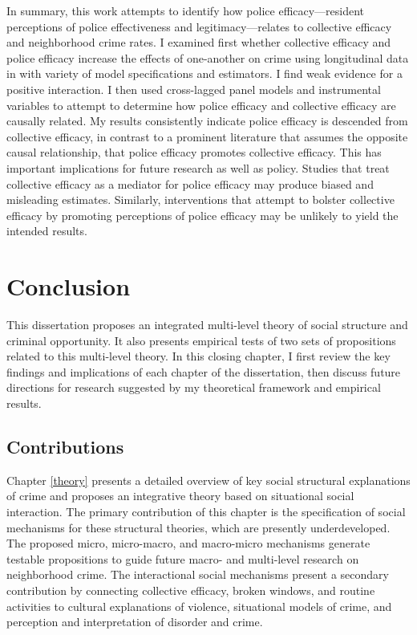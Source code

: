 \documentclass [11pt, proquest] {uwthesis}[2015/03/03]
\begin{document}
In summary, this work attempts to identify how police efficacy---resident perceptions of police effectiveness and legitimacy---relates to collective efficacy and neighborhood crime rates. I examined first whether collective efficacy and police efficacy increase the effects of one-another on crime using longitudinal data in with variety of model specifications and estimators. I find weak evidence for a positive interaction. I then used cross-lagged panel models and instrumental variables to attempt to determine how police efficacy and collective efficacy are causally related. My results consistently indicate police efficacy is descended from collective efficacy, in contrast to a prominent literature that assumes the opposite causal relationship, that police efficacy promotes collective efficacy. This has important implications for future research as well as policy. Studies that treat collective efficacy as a mediator for police efficacy may produce biased and misleading estimates. Similarly, interventions that attempt to bolster collective efficacy by promoting perceptions of police efficacy may be unlikely to yield the intended results.

\hypertarget{conclusion-1}{%
\chapter*{Conclusion}\label{conclusion-1}}

This dissertation proposes an integrated multi-level theory of social structure and criminal opportunity. It also presents empirical tests of two sets of propositions related to this multi-level theory. In this closing chapter, I first review the key findings and implications of each chapter of the dissertation, then discuss future directions for research suggested by my theoretical framework and empirical results.

\hypertarget{contributions}{%
\section{Contributions}\label{contributions}}

Chapter \ref{theory} presents a detailed overview of key social structural explanations of crime and proposes an integrative theory based on situational social interaction. The primary contribution of this chapter is the specification of social mechanisms for these structural theories, which are presently underdeveloped. The proposed micro, micro-macro, and macro-micro mechanisms generate testable propositions to guide future macro- and multi-level research on neighborhood crime. The interactional social mechanisms present a secondary contribution by connecting collective efficacy, broken windows, and routine activities to cultural explanations of violence, situational models of crime, and perception and interpretation of disorder and crime.
\end{document}
